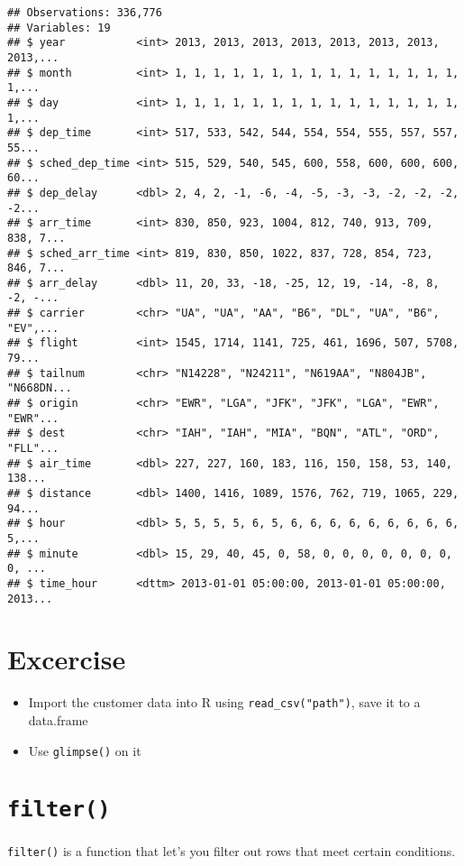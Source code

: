 \documentclass[]{book}
\providecommand{\tightlist}{%
  \setlength{\itemsep}{0pt}\setlength{\parskip}{0pt}}
\begin{document}
\begin{verbatim}
## Observations: 336,776
## Variables: 19
## $ year           <int> 2013, 2013, 2013, 2013, 2013, 2013, 2013, 2013,...
## $ month          <int> 1, 1, 1, 1, 1, 1, 1, 1, 1, 1, 1, 1, 1, 1, 1, 1,...
## $ day            <int> 1, 1, 1, 1, 1, 1, 1, 1, 1, 1, 1, 1, 1, 1, 1, 1,...
## $ dep_time       <int> 517, 533, 542, 544, 554, 554, 555, 557, 557, 55...
## $ sched_dep_time <int> 515, 529, 540, 545, 600, 558, 600, 600, 600, 60...
## $ dep_delay      <dbl> 2, 4, 2, -1, -6, -4, -5, -3, -3, -2, -2, -2, -2...
## $ arr_time       <int> 830, 850, 923, 1004, 812, 740, 913, 709, 838, 7...
## $ sched_arr_time <int> 819, 830, 850, 1022, 837, 728, 854, 723, 846, 7...
## $ arr_delay      <dbl> 11, 20, 33, -18, -25, 12, 19, -14, -8, 8, -2, -...
## $ carrier        <chr> "UA", "UA", "AA", "B6", "DL", "UA", "B6", "EV",...
## $ flight         <int> 1545, 1714, 1141, 725, 461, 1696, 507, 5708, 79...
## $ tailnum        <chr> "N14228", "N24211", "N619AA", "N804JB", "N668DN...
## $ origin         <chr> "EWR", "LGA", "JFK", "JFK", "LGA", "EWR", "EWR"...
## $ dest           <chr> "IAH", "IAH", "MIA", "BQN", "ATL", "ORD", "FLL"...
## $ air_time       <dbl> 227, 227, 160, 183, 116, 150, 158, 53, 140, 138...
## $ distance       <dbl> 1400, 1416, 1089, 1576, 762, 719, 1065, 229, 94...
## $ hour           <dbl> 5, 5, 5, 5, 6, 5, 6, 6, 6, 6, 6, 6, 6, 6, 6, 5,...
## $ minute         <dbl> 15, 29, 40, 45, 0, 58, 0, 0, 0, 0, 0, 0, 0, 0, ...
## $ time_hour      <dttm> 2013-01-01 05:00:00, 2013-01-01 05:00:00, 2013...
\end{verbatim}

\hypertarget{excercise-1}{%
\section{Excercise}\label{excercise-1}}

\begin{itemize}
\tightlist
\item
  Import the customer data into R using \texttt{read\_csv("path")}, save it to a data.frame
\item
  Use \texttt{glimpse()} on it
\end{itemize}

\hypertarget{filter}{%
\section{\texorpdfstring{\texttt{filter()}}{filter()}}\label{filter}}

\texttt{filter()} is a function that let's you filter out rows that meet certain conditions.
\end{document}
